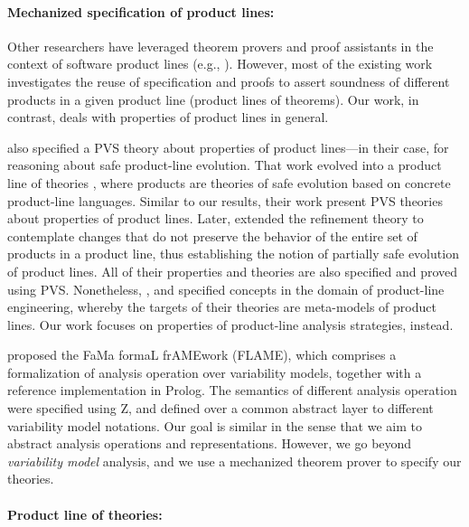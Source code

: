 \paragraph{Mechanized specification of product lines:}
Other researchers have leveraged theorem provers and proof assistants in
the context of software product lines (e.g.,
\citet{Teixeira2015,ThumProofComposition,DelawareTheoremPL,BorbaPLRefinement,Neves2011, SampaioJSS19}).
However, most of the existing work investigates the reuse of specification
and proofs to
assert soundness of different products in a given product line (product
lines of theorems).
Our work, in contrast, deals with properties of product lines in general.

\citet{BorbaPLRefinement} also specified a PVS theory about properties of
product lines---in their case, for reasoning about safe product-line
evolution.
That work evolved into a product line of theories \cite{Teixeira2015},
where products are theories of safe evolution based on concrete
product-line languages.
Similar to our results, their work present PVS theories about properties of
product lines.
Later, \citet{SampaioJSS19} extended the refinement theory to contemplate changes that do not preserve the behavior of the entire set of products in a product line, thus establishing the notion of partially safe evolution of product lines. All of their properties and theories are also specified and proved using PVS. 
Nonetheless, \citet{Neves2011}, \citet{SampaioJSS19} and \citet{Teixeira2015} specified
concepts in the domain of product-line engineering, whereby the targets of
their theories are meta-models of product lines.
Our work focuses on properties of product-line analysis strategies, instead.

\citet{FLAME:SoSym} proposed the FaMa formaL frAMEwork (FLAME), which comprises a formalization of analysis operation over variability models, together with a reference implementation in Prolog. The semantics of different analysis operation were specified using Z, and defined over a common abstract layer to different variability model notations. Our goal is similar in the sense that we aim to abstract analysis operations and representations. However, we go beyond \emph{variability model} analysis, and we use a mechanized theorem prover to specify our theories.

\paragraph{Product line of theories:}

